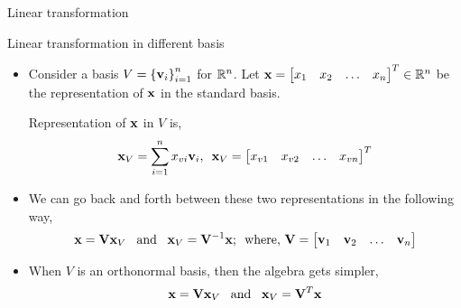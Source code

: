 \documentclass[aspectratio=169]{beamer}
\def\mf{\ensuremath\mathbf}
\def\mb{\ensuremath\mathbb}
\begin{document}
\begin{frame}[t]{Linear transformation}
\begin{center}
\end{center}

\end{frame}


\begin{frame}[t]{Linear transformation in different basis}
\begin{itemize}
    \item Consider a basis $V=\left\{\mf{v}_i\right\}_{i=1}^{n}$ for $\mb{R}^n$. Let $\mf{x} = \begin{bmatrix*}x_1 & x_2 & \ldots & x_n\end{bmatrix*}^T \in \mb{R}^n$ be the representation of $\mf{x}$ in 
    the standard basis.
    
    Representation of $\mf{x}$ in $V$ is,
    \[ \mf{x}_{V} = \sum_{i=1}^n x_{vi}\mf{v}_i, \,\,\, \mf{x}_V = \begin{bmatrix*}x_{v1} & x_{v2} & \ldots & x_{vn}\end{bmatrix*}^T \]

    \item We can go back and forth between these two representations in the following way,
    \[ \mf{x} = \mf{V}\mf{x}_V \,\,\, \text{ and } \,\,\, \mf{x}_V = \mf{V}^{-1}\mf{x}; \,\,\, \text{where, } \mf{V} = \begin{bmatrix*}\mf{v}_1 & \mf{v}_2 & \ldots & \mf{v}_n\end{bmatrix*} \]

    \item When $V$ is an orthonormal basis, then the algebra gets simpler,
    \[ \mf{x} = \mf{V}\mf{x}_V \,\,\, \text{ and } \,\,\, \mf{x}_V = \mf{V}^T\mf{x} \]

\end{itemize}
\end{frame}
\end{document}

